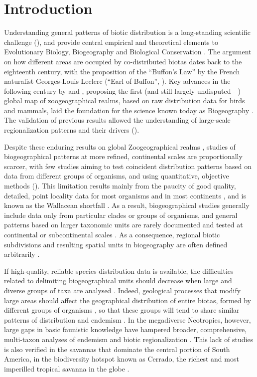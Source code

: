 \documentclass[12pt,openright,oneside,a4paper,english]{abntex2}
\begin{document}
\section{Introduction}

Understanding general patterns of biotic distribution is a long-standing scientific challenge (\citealp[e.g.][]{Brown1995}), and provide central empirical and theoretical elements to Evolutionary Biology, Biogeography and Biological Conservation \citep{KreftJetz2010, Holt2013, Whittaker2013}. The argument on how different areas are occupied by co-distributed biotas dates back to the eighteenth century, with the proposition of the “Buffon’s Law” by the French naturalist Georges-Louis Leclerc (“Earl of Buffon”, \citealp[see][]{Cox2016}). Key advances in the following century by \citet{Sclater1858} and \citet{Wallace1876}, proposing the first (and still largely undisputed - \citealp[see][]{Holt2013}) global map of zoogeographical realms, based on raw distribution data for birds and mammals, laid the foundation for the science known today as Biogeography \citep{Cox2016}. The validation of previous results allowed the understanding of large-scale regionalization patterns and their drivers (\citealp[see][]{Ficetola2017}).

Despite these enduring results on global Zoogeographical realms \citep{Sclater1858, Wallace1876, Holt2013}, studies of biogeographical patterns at more refined, continental scales are proportionally scarcer, with few studies aiming to test coincident distribution patterns based on data from different groups of organisms, and using quantitative, objective methods (\citealp[see][]{Holt2013, Edler2017}). This limitation results mainly from the paucity of good quality, detailed, point locality data for most organisms and in most continents \citep{Holt2013}, and is known as the Wallacean shortfall \citep{Whittaker2005}. As a result, biogeographical studies generally include data only from particular clades or groups of organisms, and general patterns based on larger taxonomic units are rarely documented and tested at continental or subcontinental scales \citep{KreftJetz2010, Holt2013}. As a consequence, regional biotic subdivisions and resulting spatial units in biogeography are often defined arbitrarily \citep{KreftJetz2010, Edler2017}.

If high-quality, reliable species distribution data is available, the difficulties related to delimiting biogeographical units should decrease when large and diverse groups of taxa are analysed \citep{Nelson1981, KreftJetz2010}. Indeed, geological processes that modify large areas should affect the geographical distribution of entire biotas, formed by different groups of organisms \citep{Wiley1988}, so that these groups will tend to share similar patterns of distribution and endemism \citep{Wiley1988, Hausdorf2002}. In the megadiverse Neotropics, however, large gaps in basic faunistic knowledge have hampered broader, comprehensive, multi-taxon analyses of endemism and biotic regionalization \citep{KreftJetz2010, Holt2013}. This lack of studies is also verified in the savannas that dominate the central portion of South America, in the biodiversity hotspot known as Cerrado, the richest and most imperilled tropical savanna in the globe \citep{Colli2020}.
\end{document}
